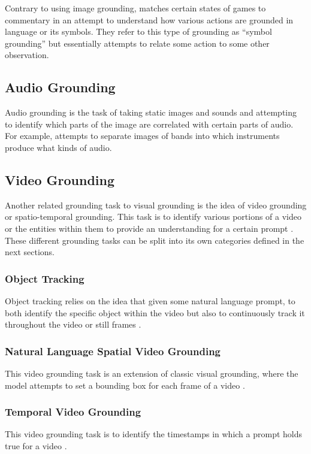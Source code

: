 \documentclass[11pt]{article}
\begin{document}
Contrary to using image grounding, \citet{kameko-etal-2015-symbol} matches certain states of games to commentary in an attempt to understand how various actions are grounded in language or its symbols. They refer to this type of grounding as ``symbol grounding'' but essentially attempts to relate some action to some other observation.

\subsection{Audio Grounding}
Audio grounding is the task of taking static images and sounds and attempting to identify which parts of the image are correlated with certain parts of audio. For example, \citet{Tian_2021_CVPR_cyclic_audio} attempts to separate images of bands into which instruments produce what kinds of audio.

\subsection{Video Grounding}
Another related grounding task to visual grounding is the idea of video grounding or spatio-temporal grounding. This task is to identify various portions of a video or the entities within them to provide an understanding for a certain prompt \cite{Jiang_Cheng_Liu_Fang_Peng_Liu_2024_comprehensive_visual_grounding}. These different grounding tasks can be split into its own categories defined in the next sections.

\subsubsection{Object Tracking}
Object tracking relies on the idea that given some natural language prompt, to both identify the specific object within the video but also to continuously track it throughout the video or still frames \cite{Zhou_2023_CVPR_Tracking}.

\subsubsection{Natural Language Spatial Video Grounding}
This video grounding task is an extension of classic visual grounding, where the model attempts to set a bounding box for each frame of a video \cite{li-etal-2022-end-to-end-information-tree,ma2020learninggenerategroundedvisual}.

\subsubsection{Temporal Video Grounding}
This video grounding task is to identify the timestamps in which a prompt holds true for a video \cite{li-etal-2024-groundinggpt, NEURIPS2023_how_to_video,Bao_Zheng_Mu_2021_dense_events, chen-etal-2018-temporally}.
\end{document}
